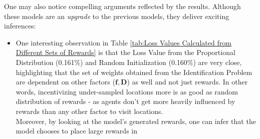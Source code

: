 \documentclass[12pt]{article}
\newcommand{\matr}[1]{\mathbf{#1}}  %
\begin{document}
    One may also notice compelling arguments reflected by the results. Although these models are an \textit{upgrade} to the previous models, they deliver exciting inferences:
    \begin{itemize}
        \item One interesting observation in Table \ref{tab:Loss Values Calculated from Different Sets of Rewards} is that the Loss Value from the Proportional Distribution (0.161\%) and Random Initialization (0.160\%) are very close, highlighting that the set of weights obtained from the Identification Problem are dependent on other factors ($\matr{f}, \matr{D}$) as well and not just rewards. In other words, incentivizing under-sampled locations more is as good as random distribution of rewards - as agents don't get more heavily influenced by rewards than any other factor to visit locations.\\
        Moreover, by looking at the model's generated rewards, one can infer that the model chooses to place large rewards in 
    \end{itemize}
    
    
    \blindtext
    
    
    
    \cleardoublepage
    
\end{document}
